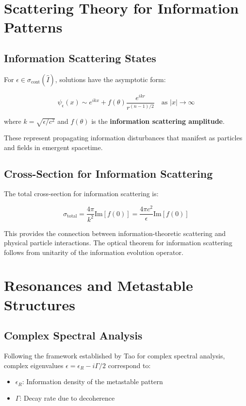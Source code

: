 \documentclass[12pt]{article}
\begin{document}
\section{Scattering Theory for Information Patterns}

\subsection{Information Scattering States}

For $\epsilon \in \sigma_{\text{cont}}(\hat{I})$, solutions have the asymptotic form:

\begin{equation}
\psi_{\epsilon}(x) \sim e^{ikx} + f(\theta)\frac{e^{ikr}}{r^{(n-1)/2}} \quad \text{as } |x| \to \infty
\end{equation}

where $k = \sqrt{\epsilon/c^2}$ and $f(\theta)$ is the \textbf{information scattering amplitude}.

These represent propagating information disturbances that manifest as particles and fields in emergent spacetime.

\subsection{Cross-Section for Information Scattering}

The total cross-section for information scattering is:

\begin{equation}
\sigma_{\text{total}} = \frac{4\pi}{k^2} \text{Im}[f(0)] = \frac{4\pi c^2}{\epsilon} \text{Im}[f(0)]
\end{equation}

This provides the connection between information-theoretic scattering and physical particle interactions. The optical theorem for information scattering follows from unitarity of the information evolution operator.

\section{Resonances and Metastable Structures}

\subsection{Complex Spectral Analysis}

Following the framework established by Tao for complex spectral analysis, complex eigenvalues $\epsilon = \epsilon_R - i\Gamma/2$ correspond to:
\begin{itemize}
\item $\epsilon_R$: Information density of the metastable pattern
\item $\Gamma$: Decay rate due to decoherence
\end{itemize}
\end{document}
